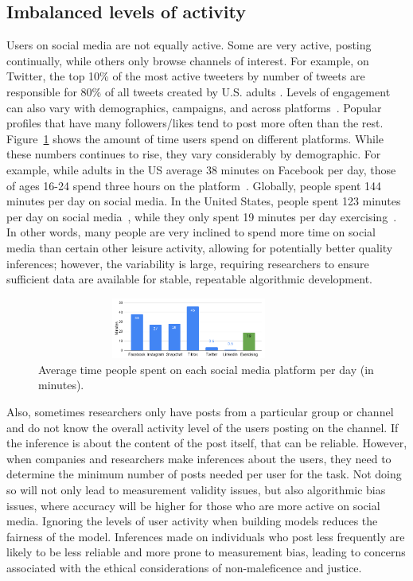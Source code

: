 \documentclass[11pt]{article} %
\begin{document}
\subsection{Imbalanced levels of activity}
Users on social media are not equally active. Some are very active, posting continually, while others only browse channels of interest. For example, on Twitter, the top 10\% of the most active tweeters by number of tweets are responsible for 80\% of all tweets created by U.S. adults \cite{pew_twitter}. Levels of engagement can also vary with demographics, campaigns, and across platforms~\cite{perrin2019}. Popular profiles that have many followers/likes tend to post more often than the rest. Figure~\ref{fig:mins_per_day} shows the amount of time users spend on different platforms. While these numbers continues to rise, they vary considerably by demographic. For example, while adults in the US average 38 minutes on Facebook per day, those of ages 16-24 spend three hours on the platform~\cite{whatagraph2020}. Globally, people spent 144 minutes per day on social media. In the United States, people spent 123 minutes per day on social media~\cite{sm_usage}, while they only spent 19 minutes per day exercising~\cite{american_time_spent2020}. In other words, many people are very inclined to spend more time on social media than certain other leisure activity, allowing for potentially better quality inferences; however, the variability is large, requiring researchers to ensure sufficient data are available for stable, repeatable algorithmic development. 
\begin{figure}
    \centering
        \includegraphics[width=10cm,height = 2cm]{figs/time_spentExercise.png}
    \caption{Average time people spent on each social media platform per day (in minutes).} 
    \label{fig:mins_per_day}
\end{figure}


Also, sometimes researchers only have posts from a particular group or channel and do not know the overall activity level of the users posting on the channel. If the inference is about the content of the post itself, that can be reliable. However, when companies and researchers make inferences about the users, they need to determine the minimum number of posts needed per user for the task. Not doing so will not only lead to measurement validity issues, but also algorithmic bias issues, where accuracy will be higher for those who are more active on social media. Ignoring the levels of user activity when building models reduces the fairness of the model. Inferences made on individuals who post less frequently are likely to be less reliable and more prone to measurement bias, leading to concerns associated with the ethical considerations of non-maleficence and justice.
\end{document}
